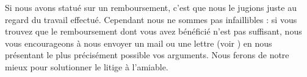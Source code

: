 ﻿Si nous avons statué sur un remboursement, c'est que nous le jugions juste au regard du travail effectué. Cependant nous ne sommes pas infaillibles : si vous trouvez que le remboursement dont vous avez bénéficié n'est pas suffisant, nous vous encourageons à nous envoyer un mail ou une lettre (voir ) en nous présentant le plus précisément possible vos arguments. Nous ferons de notre mieux pour solutionner le litige à l'amiable.